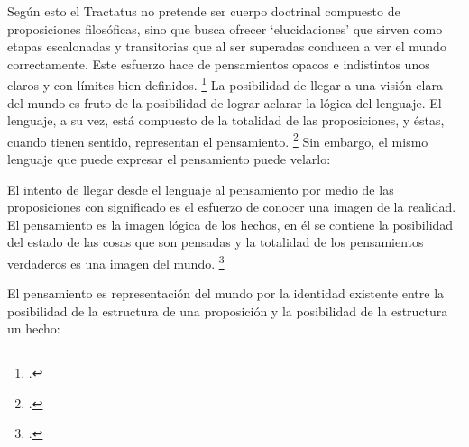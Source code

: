 Según esto el Tractatus no pretende ser cuerpo doctrinal compuesto de
proposiciones filosóficas, sino que busca ofrecer `elucidaciones' que sirven
como etapas escalonadas y transitorias que al ser superadas conducen a ver el
mundo correctamente. Este esfuerzo hace de pensamientos opacos e indistintos
unos claros y con límites bien definidos. \footcite[cf. 4.112 y 6.54]{tractatus}
La posibilidad de llegar a una visión clara del mundo es fruto de la posibilidad
de lograr aclarar la lógica del lenguaje. El lenguaje, a su vez, está
compuesto de la totalidad de las proposiciones, y éstas, cuando tienen sentido,
representan el pensamiento. \footcite[cf. 4 y 4.001]{tractatus} Sin embargo, el
mismo lenguaje que puede expresar el pensamiento puede velarlo: 


El intento de llegar desde el lenguaje al pensamiento por medio de las
proposiciones con significado es el esfuerzo de conocer una imagen de la
realidad. El pensamiento es la imagen lógica de los hechos, en él se contiene la
posibilidad del estado de las cosas que son pensadas y la totalidad de los
pensamientos verdaderos es una imagen del mundo. \footcite[cf. 3 y
3.001]{tractatus}

El pensamiento es representación
del mundo por la identidad existente entre la posibilidad de la estructura de
una proposición y la posibilidad de la estructura un hecho: 

